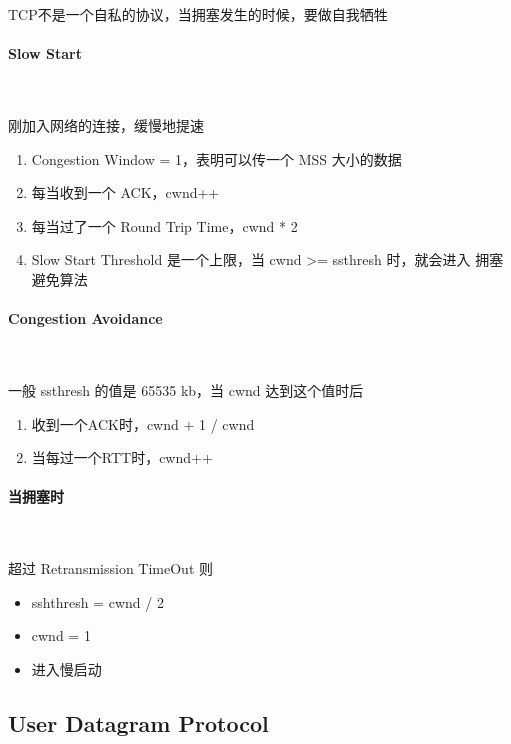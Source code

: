 \documentclass[11pt,journal,compsoc]{IEEEtran}
\begin{document}
TCP不是一个自私的协议，当拥塞发生的时候，要做自我牺牲

\paragraph{Slow Start} ~

刚加入网络的连接，缓慢地提速

\begin{enumerate}
    \item Congestion Window = 1，表明可以传一个 MSS 大小的数据

    \item 每当收到一个 ACK，cwnd++

    \item 每当过了一个 Round Trip Time，cwnd * 2

    \item Slow Start Threshold 是一个上限，当 cwnd >= ssthresh 时，就会进入 拥塞避免算法
\end{enumerate}

\paragraph{Congestion Avoidance} ~

一般 ssthresh 的值是 65535 kb，当 cwnd 达到这个值时后

\begin{enumerate}
    \item 收到一个ACK时，cwnd + 1 / cwnd

    \item 当每过一个RTT时，cwnd++
\end{enumerate}

\paragraph{当拥塞时} ~

超过 Retransmission TimeOut 则

\begin{itemize}
    \item sshthresh = cwnd / 2
    \item cwnd = 1
    \item 进入慢启动
\end{itemize}


\subsection{User Datagram Protocol}
\end{document}
